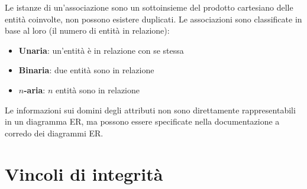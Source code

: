 \documentclass[12pt, a4paper]{report}
\begin{document}
    Le istanze di un'associazione sono un sottoinsieme del prodotto cartesiano delle entità coinvolte, non possono esistere duplicati. Le associazioni sono classificate in base al loro  (il numero di entità in relazione):
    \begin{itemize}
        \item \textbf{Unaria}: un'entità è in relazione con se stessa
        \item \textbf{Binaria}: due entità sono in relazione
        \item \textbf{$n$-aria}: $n$ entità sono in relazione
    \end{itemize}
    Le informazioni sui domini degli attributi non sono direttamente rappresentabili in un diagramma ER, ma possono essere specificate nella documentazione a corredo dei diagrammi ER.
    \section{Vincoli di integrità}
\end{document}
